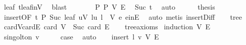 \begin{isabellebody}
\ leaf\ t{\isachardot}{\kern0pt}leaf{\isacharunderscore}{\kern0pt}in{\isacharunderscore}{\kern0pt}V\ \isamarkupfalse%
\ blast\isanewline
\ \ \ \ \isamarkupfalse%
\ \isamarkupfalse%
\ P{\isacharprime}{\kern0pt}{\isacharcolon}{\kern0pt}\ {\isachardoublequoteopen}P\ {\isacharquery}{\kern0pt}V{\isacharprime}{\kern0pt}\ {\isacharquery}{\kern0pt}E{\isacharprime}{\kern0pt}{\isachardoublequoteclose}\ \isamarkupfalse%
\ Suc\ t{\isacharprime}{\kern0pt}\ \isamarkupfalse%
\ auto\isanewline
\ \ \ \ \isamarkupfalse%
\ {\isacharquery}{\kern0pt}thesis\ \isamarkupfalse%
\ insert{\isacharbrackleft}{\kern0pt}OF\ t{\isacharprime}{\kern0pt}\ P{\isacharprime}{\kern0pt}{\isacharbrackright}{\kern0pt}\ Suc\ leaf\ {\isacartoucheopen}u{\isasymin}V{\isacartoucheclose}\ {\isacartoucheopen}l{\isasymnoteq}u{\isacartoucheclose}\ {\isacartoucheopen}l\ {\isasymin}\ V{\isacartoucheclose}\ e\ e{\isacharunderscore}{\kern0pt}in{\isacharunderscore}{\kern0pt}E\ \isamarkupfalse%
\ {\isacharparenleft}{\kern0pt}auto{\isacharcomma}{\kern0pt}\ metis\ insert{\isacharunderscore}{\kern0pt}Diff{\isacharparenright}{\kern0pt}\isanewline
\ \ \isamarkupfalse%
\isanewline
{}\isamarkupfalse%
%
\endisatagproof
{\isafoldproof}%
%
\isadelimproof
\isanewline
%
\endisadelimproof
\isanewline
{}\isamarkupfalse%
\ tree\isanewline
{}\isanewline
\isanewline
{}\isamarkupfalse%
\ card{\isacharunderscore}{\kern0pt}V{\isacharunderscore}{\kern0pt}card{\isacharunderscore}{\kern0pt}E{\isacharcolon}{\kern0pt}\ {\isachardoublequoteopen}card\ V\ {\isacharequal}{\kern0pt}\ Suc\ {\isacharparenleft}{\kern0pt}card\ E{\isacharparenright}{\kern0pt}{\isachardoublequoteclose}\isanewline
%
\isadelimproof
\ \ %
\endisadelimproof
%
\isatagproof
{}\isamarkupfalse%
\ tree{\isacharunderscore}{\kern0pt}axioms\isanewline
{}\isamarkupfalse%
\ {\isacharparenleft}{\kern0pt}induction\ V\ E{\isacharparenright}{\kern0pt}\isanewline
\ \ \isamarkupfalse%
\ {\isacharparenleft}{\kern0pt}singolton\ v{\isacharparenright}{\kern0pt}\isanewline
\ \ \isamarkupfalse%
\ \isamarkupfalse%
\ {\isacharquery}{\kern0pt}case\ \isamarkupfalse%
\ auto\isanewline
{}\isamarkupfalse%
\isanewline
\ \ \isamarkupfalse%
\ {\isacharparenleft}{\kern0pt}insert\ l\ v\ V{\isacharprime}{\kern0pt}\ E{\isacharprime}{\kern0pt}{\isacharparenright}{\kern0pt}\isanewline

\end{isabellebody}
